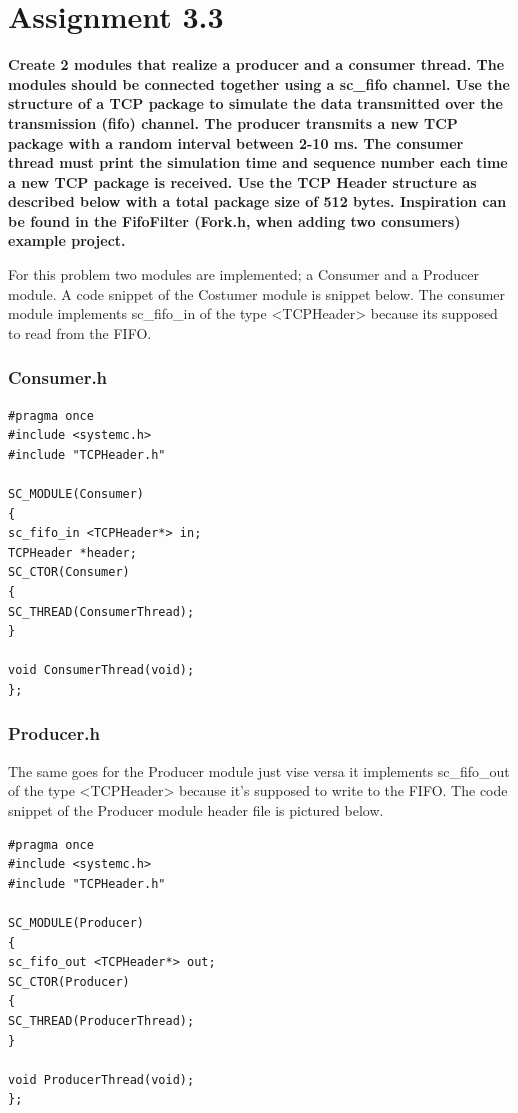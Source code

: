 
\chapter{Assignment 3.3}

\textbf{Create 2 modules that realize a producer and a consumer thread. The modules should be
	connected together using a sc\_fifo channel. Use the structure of a TCP package to simulate the
	data transmitted over the transmission (fifo) channel. The producer transmits a new TCP package
	with a random interval between 2-10 ms. The consumer thread must print the simulation time and
	sequence number each time a new TCP package is received. Use the TCP Header structure as
	described below with a total package size of 512 bytes. Inspiration can be found in the FifoFilter
	(Fork.h, when adding two consumers) example project.
}

For this problem two modules are implemented; a Consumer and a Producer module. 
A code snippet of the Costumer module is snippet below. 
The consumer module implements sc\_fifo\_in of the type <TCPHeader> because its supposed to read from the FIFO.

\subsection{Consumer.h}
\begin{lstlisting}
#pragma once
#include <systemc.h>
#include "TCPHeader.h"

SC_MODULE(Consumer)
{
sc_fifo_in <TCPHeader*> in;
TCPHeader *header;
SC_CTOR(Consumer)
{
SC_THREAD(ConsumerThread);
}

void ConsumerThread(void);
};
\end{lstlisting}


\subsection{Producer.h}
The same goes for the Producer module just vise versa it implements sc\_fifo\_out of the type <TCPHeader> because it’s supposed to write to the FIFO. The code snippet of the Producer module header file is pictured below.
\begin{lstlisting}
#pragma once
#include <systemc.h>
#include "TCPHeader.h"

SC_MODULE(Producer)
{
sc_fifo_out <TCPHeader*> out;
SC_CTOR(Producer)
{
SC_THREAD(ProducerThread);
}

void ProducerThread(void);
};
\end{lstlisting}





